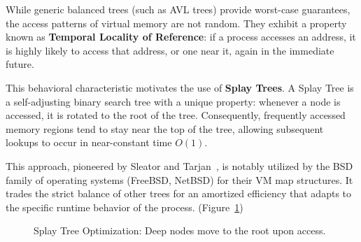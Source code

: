 \documentclass[a4paper,10pt,twoside]{report}
\theoremstyle{definition}
\begin{document}
While generic balanced trees (such as AVL trees) provide worst-case guarantees, the access patterns of virtual memory are not random. They exhibit a property known as \textbf{Temporal Locality of Reference}: if a process accesses an address, it is highly likely to access that address, or one near it, again in the immediate future.

This behavioral characteristic motivates the use of \textbf{Splay Trees}. A Splay Tree is a self-adjusting binary search tree with a unique property: whenever a node is accessed, it is rotated to the root of the tree. Consequently, frequently accessed memory regions tend to stay near the top of the tree, allowing subsequent lookups to occur in near-constant time $O(1)$.

This approach, pioneered by Sleator and Tarjan~\cite{sleator1985splay}, is notably utilized by the BSD family of operating systems (FreeBSD, NetBSD) for their VM map structures. It trades the strict balance of other trees for an amortized efficiency that adapts to the specific runtime behavior of the process. (Figure~\ref{fig:splay_tree})

\begin{figure}[htbp]
\centering
{}
\caption{Splay Tree Optimization: Deep nodes move to the root upon access.}
\label{fig:splay_tree}
\end{figure}
\end{document}
